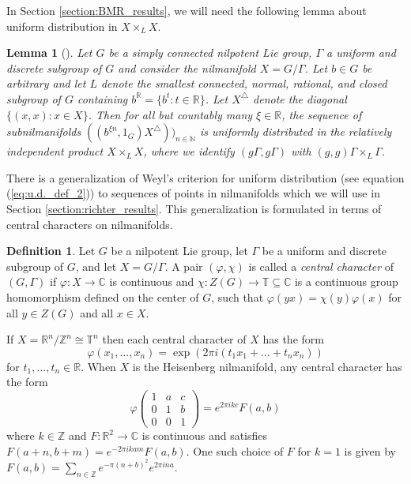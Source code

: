 \documentclass[12pt]{article}
\theoremstyle{plain} %
\newtheorem{lemma}[theorem]{Lemma}
\theoremstyle{definition} %
\newtheorem{definition}[theorem]{Definition}
\theoremstyle{plain}
\theoremstyle{plain}
\numberwithin{equation}{section}
\newcommand{\N}{\mathbb{N}}
\newcommand{\Z}{\mathbb{Z}}
\newcommand{\R}{\mathbb{R}}
\newcommand{\C}{\mathbb{C}}
\newcommand{\T}{\mathbb{T}}
\renewcommand{\subset}{\subseteq}
\newcommand{\1}{\mathbbm{1}}
\begin{document}
    
    In Section \ref{section:BMR_results}, we will need the following lemma about uniform distribution in $X\times_L X$.
 \begin{lemma}[{\cite[Lemma 4.3]{Richter23}}]\label{lem:wd_in_diagonal}
Let $G$ be a simply connected nilpotent Lie group, $\Gamma$ a uniform and discrete subgroup of $G$ and consider the nilmanifold $X=G/\Gamma$. Let $b \in G$ be arbitrary and let $L$ denote the smallest connected, normal, rational, and closed subgroup of $G$ containing $b^{\R} = \{b^t : t \in \R\}$. Let $X^{\triangle}$ denote the diagonal $\{(x, x) : x \in X\}$. Then for all but countably many $\xi \in\R$, the sequence of subnilmanifolds $((b^{\xi n}, 1_G)X^{\triangle}))_{n\in \N}$ is uniformly distributed in the
relatively independent product $X\times_L X$, where we identify $(g\Gamma, g\Gamma)$ with $(g,g)\Gamma\times_L \Gamma$. 
\end{lemma}

There is a generalization of Weyl's criterion for uniform distribution (see equation (\ref{eq:u.d._def_2})) to sequences of points in nilmanifolds which we will use in Section \ref{section:richter_results}. This generalization is formulated in terms of central characters on nilmanifolds.

\begin{definition}
    Let $G$ be a nilpotent Lie group, let $\Gamma$ be a uniform and discrete subgroup of $G$, and let $X=G/\Gamma$. A pair $(\varphi,\chi)$ is called a \emph{central character} of $(G,\Gamma)$ if $\varphi:X\rightarrow  \C$ is continuous and $\chi:Z(G)\rightarrow \T\subset \C$ is a continuous group homomorphism defined on the center of $G$, such that $\varphi(yx) = \chi(y)\varphi(x)$ for all $y\in Z(G)$ and all $x\in X$.
\end{definition}
If $X = \R^n/\Z^n\cong \T^n$ then each central character of $X$ has the form
\begin{equation}\label{eq:character_example}
    \varphi(x_1,\dots, x_n) = \exp(2\pi i ({t_1x_1+\dots+t_nx_n}))
\end{equation}
for $t_1,\dots, t_n\in \R$. When $X$ is the Heisenberg nilmanifold, any central character has the form 
$$
\varphi \begin{pmatrix}
            1 & a & c\\
            0 & 1 & b\\
            0 & 0 & 1
            \end{pmatrix} = e^{2\pi i k c}F(a,b)
$$
where $k\in \Z$ and $F:\R^2\rightarrow \C$ is continuous and satisfies $F(a+n,b+m) = e^{-2\pi i k am}F(a,b)$. One such choice of $F$ for $k=1$ is given by $F(a,b) = \sum_{n\in \Z}e^{-\pi(n+b)^2}e^{2\pi i n a}$.
\end{document}
